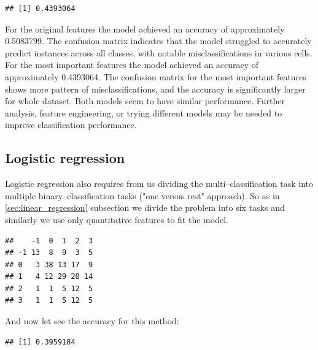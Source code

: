 \documentclass[11pt,a4paper]{article}\usepackage[]{graphicx}\usepackage[]{xcolor}
\makeatletter
\newenvironment{kframe}{%
 \def\at@end@of@kframe{}%
 \ifinner\ifhmode%
  \def\at@end@of@kframe{\end{minipage}}%
  \begin{minipage}{\columnwidth}%
 \fi\fi%
 \def\FrameCommand##1{\hskip\@totalleftmargin \hskip-\fboxsep
 \colorbox{shadecolor}{##1}\hskip-\fboxsep
     \hskip-\linewidth \hskip-\@totalleftmargin \hskip\columnwidth}%
 \MakeFramed {\advance\hsize-\width
   \@totalleftmargin\z@ \linewidth\hsize
   \@setminipage}}%
 {\par\unskip\endMakeFramed%
 \at@end@of@kframe}
\newenvironment{knitrout}{}{} %
\makeatother
\begin{document}
\begin{knitrout}
\color{fgcolor}\begin{kframe}
\begin{verbatim}
## [1] 0.4393064
\end{verbatim}
\end{kframe}
\end{knitrout}

	
	

For the original features the model achieved an accuracy of approximately 0.5083799.
The confusion matrix indicates that the model struggled to accurately predict instances across all classes, with notable misclassifications in various cells.
For the most important features the model achieved an accuracy of approximately 0.4393064.
The confusion matrix for the most important features shows more pattern of misclassifications, and the accuracy is significantly larger for whole dataset.
Both models seem to have similar performance.
Further analysis, feature engineering, or trying different models may be needed to improve classification performance.
	\subsection{Logistic regression}
	Logistic regression also requires from us dividing the multi--classification task into multiple binary--classification tasks ("one versus rest" approach). So as in \ref{sec:linear_regression} subsection we divide the problem into six tasks and similarly we use only quantitative features to fit the model. 

	
\begin{knitrout}
\color{fgcolor}\begin{kframe}
\begin{verbatim}
##    -1  0  1  2  3
## -1 13  8  9  3  5
## 0   3 38 13 17  9
## 1   4 12 29 20 14
## 2   1  1  5 12  5
## 3   1  1  5 12  5
\end{verbatim}
\end{kframe}
\end{knitrout}
	And now let see the accuracy for this method:
\begin{knitrout}
\color{fgcolor}\begin{kframe}
\begin{verbatim}
## [1] 0.3959184
\end{verbatim}
\end{kframe}
\end{knitrout}
	
\end{document}

